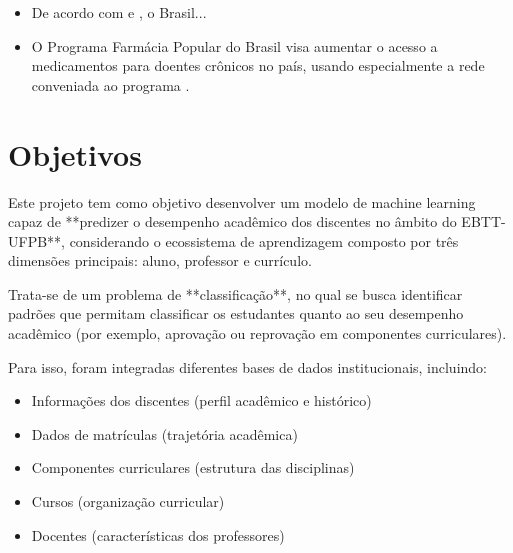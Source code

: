 	\begin{itemize}
		\item De acordo com \cite{Almeida2019} e \cite{Silva2019}, o Brasil...
		\item O Programa Farmácia Popular do Brasil visa aumentar o acesso a medicamentos para doentes crônicos no país, usando especialmente a rede conveniada ao programa \citep{Almeida2019}.
	\end{itemize}





    
\section{Objetivos}
Este projeto tem como objetivo desenvolver um modelo de machine learning capaz de **predizer o desempenho acadêmico dos discentes no âmbito do EBTT-UFPB**, considerando o ecossistema de aprendizagem composto por três dimensões principais: aluno, professor e currículo.

Trata-se de um problema de **classificação**, no qual se busca identificar padrões que permitam classificar os estudantes quanto ao seu desempenho acadêmico (por exemplo, aprovação ou reprovação em componentes curriculares).

Para isso, foram integradas diferentes bases de dados institucionais, incluindo:
\begin{itemize}
    \item Informações dos discentes (perfil acadêmico e histórico)
    \item Dados de matrículas (trajetória acadêmica)
    \item Componentes curriculares (estrutura das disciplinas)
    \item Cursos (organização curricular)
    \item Docentes (características dos professores)
\end{itemize}



